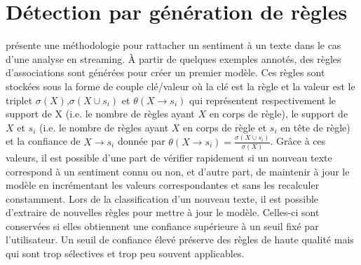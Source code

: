 \documentclass[utf8]{stageM2R} %
\theoremstyle{remark}
\begin{document}
\section{Détection par génération de règles}
\cite{Silva2011a} présente une méthodologie pour rattacher un sentiment à un texte dans le cas d'une analyse en streaming. À partir de quelques exemples annotés, des règles d'associations sont générées pour créer un premier modèle. Ces règles sont stockées sous la forme de couple clé/valeur où la clé est la règle et la valeur est le triplet $\sigma(X)$,$\sigma(X\cup s_i)$ et $\theta(X\rightarrow s_i)$ qui représentent respectivement le support de X (i.e. le nombre de règles ayant $X$ en corps de règle), le support de $X$ et $s_i$ (i.e. le nombre de règles ayant $X$ en corps de règle et $s_i$ en tête de règle) et la confiance  de $X\rightarrow s_i$ donnée par $\theta(X\rightarrow s_i) = \frac{\sigma(X\cup s_i)}{\sigma(X)}$. Grâce à ces valeurs, il est possible d'une part de vérifier rapidement si un nouveau texte correspond à un sentiment connu ou non, et d'autre part, de maintenir à jour le modèle en incrémentant les valeurs correspondantes et sans les recalculer constamment. Lors de la classification d'un nouveau texte, il est possible d'extraire de nouvelles règles pour mettre à jour le modèle. Celles-ci sont conservées si elles obtiennent une confiance supérieure à un seuil fixé par l'utilisateur. Un seuil de confiance élevé préserve des règles de haute qualité mais qui sont trop sélectives et trop peu souvent applicables.
\end{document}
